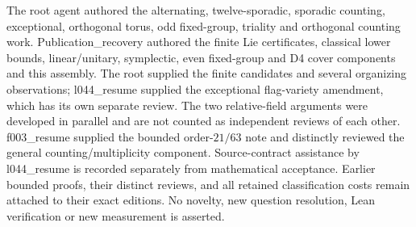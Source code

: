 \documentclass[11pt,a4paper]{article}
\begin{document}
The root agent authored the alternating, twelve-sporadic, sporadic counting, exceptional,
orthogonal torus, odd fixed-group, triality and orthogonal counting work.
Publication\_recovery authored the finite Lie certificates, classical
lower bounds, linear/unitary, symplectic, even fixed-group and D4 cover
components and this assembly. The root supplied the finite candidates and
several organizing observations; l044\_resume supplied the exceptional
flag-variety amendment, which has its own separate review. The two
relative-field arguments were developed in parallel and are not counted
as independent reviews of each other. f003\_resume supplied the bounded
order-$21/63$ note and distinctly reviewed the general counting/multiplicity component.
Source-contract assistance by l044\_resume is recorded separately from
mathematical acceptance. Earlier bounded proofs, their distinct reviews,
and all retained classification costs remain attached to their exact
editions. No novelty, new question resolution, Lean verification or new
measurement is asserted.
\end{document}
